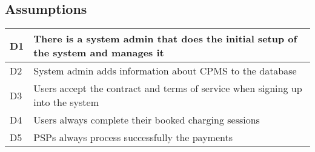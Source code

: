 \subsection{Assumptions}
\begin{tabular}{|l|l|}
	\hline
	D1 & There is a system admin that does the initial setup of the system and manages it\\
	\hline
	D2 & System admin adds information about CPMS to the database\\
	\hline
	D3 & Users accept the contract and terms of service when signing up into the system\\
	\hline
	D4 & Users always complete their booked charging sessions\\
	\hline
	D5 & PSPs always process successfully the payments\\
	\hline
\end{tabular}





















